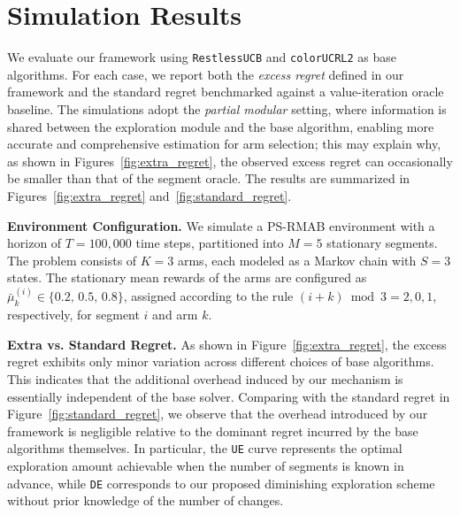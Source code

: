 \documentclass[twoside]{article}
\theoremstyle{plain}
\theoremstyle{definition}
\theoremstyle{remark}
\begin{document}
\section{Simulation Results}
\vspace{-5pt}
\label{sec:sim}

We evaluate our framework using \texttt{RestlessUCB} and \texttt{colorUCRL2} as base algorithms.  
For each case, we report both the \emph{excess regret} defined in our framework and the standard regret benchmarked against a value-iteration oracle baseline.  
The simulations adopt the \emph{partial modular} setting, where information is shared between the exploration module and the base algorithm, enabling more accurate and comprehensive estimation for arm selection; this may explain why, as shown in Figures~\ref{fig:extra_regret}, the observed excess regret can occasionally be smaller than that of the segment oracle.
The results are summarized in Figures~\ref{fig:extra_regret} and~\ref{fig:standard_regret}.


\textbf{Environment Configuration.} 
We simulate a PS-RMAB environment with a horizon of $T=100{,}000$ time steps, partitioned into $M=5$ stationary segments. 
The problem consists of $K=3$ arms, each modeled as a Markov chain with $S=3$ states. 
The stationary mean rewards of the arms are configured as 
$\bar{\mu}^{(i)}_k \in \{0.2,\,0.5,\,0.8\}$, 
assigned according to the rule $(i+k)\bmod 3 = 2,0,1$, respectively, for segment $i$ and arm $k$.


\textbf{Extra vs. Standard Regret.} 
As shown in Figure~\ref{fig:extra_regret}, the excess regret exhibits only minor variation across different choices of base algorithms.  
This indicates that the additional overhead induced by our mechanism is essentially independent of the base solver.  
Comparing with the standard regret in Figure~\ref{fig:standard_regret}, we observe that the overhead introduced by our framework is negligible relative to the dominant regret incurred by the base algorithms themselves.  
In particular, the \texttt{UE} curve represents the optimal exploration amount achievable when the number of segments is known in advance, while \texttt{DE} corresponds to our proposed diminishing exploration scheme without prior knowledge of the number of changes.
\end{document}
